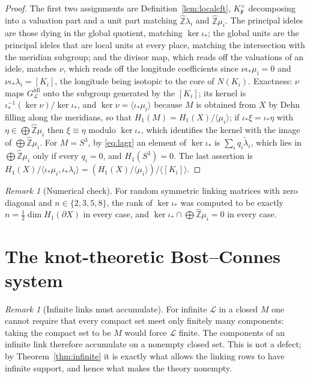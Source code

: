 \documentclass[11pt]{amsart}
\numberwithin{equation}{section}
\theoremstyle{definition}
\theoremstyle{remark}
\newtheorem{remark}[theorem]{Remark}
\newcommand{\Z}{\mathbb{Z}}
\newcommand{\hZ}{\widehat{\Z}}
\newcommand{\cL}{\mathcal{L}}
\newcommand{\pp}{\mathfrak{p}}
\newcommand{\tlam}{\widetilde\lambda}
\begin{document}
\begin{proof}
The first two assignments are Definition~\ref{lem:localcft}, $K_\pp^\times$ decomposing into
a valuation part and a unit part matching $\hZ\lambda_i$ and $\hZ\mu_i$. The principal ideles
are those dying in the global quotient, matching $\ker\iota_*$; the global units are the
principal ideles that are local units at every place, matching the intersection with the
meridian subgroup; and the divisor map, which reads off the valuations of an idele, matches
$\nu$, which reads off the longitude coefficients since $\nu\iota_*\mu_i=0$ and
$\nu\iota_*\lambda_i=[K_i]$, the longitude being isotopic to the core of $N(K_i)$. Exactness:
$\nu$ maps $G_\cL^{\mathrm{idl}}$ onto the subgroup generated by the $[K_i]$; its kernel is
$\iota_*^{-1}(\ker\nu)/\ker\iota_*$, and $\ker\nu=\langle\iota_*\mu_i\rangle$ because $M$ is
obtained from $X$ by Dehn filling along the meridians, so that $H_1(M)=H_1(X)/\langle\mu_i\rangle$;
if $\iota_*\xi=\iota_*\eta$ with $\eta\in\bigoplus\hZ\mu_i$ then $\xi\equiv\eta$ modulo
$\ker\iota_*$, which identifies the kernel with the image of $\bigoplus\hZ\mu_i$. For
$M=S^3$, by \eqref{eq:lagr} an element of $\ker\iota_*$ is $\sum_iq_i\tlam_i$, which lies in
$\bigoplus\hZ\mu_i$ only if every $q_i=0$, and $H_1(S^3)=0$. The last assertion is
$H_1(X)/\langle\iota_*\mu_i,\iota_*\lambda_i\rangle=(H_1(X)/\langle\mu_i\rangle)/\langle[K_i]\rangle$.
\end{proof}

\begin{remark}[Numerical check]\label{rem:numlagr}
For random symmetric linking matrices with zero diagonal and $n\in\{2,3,5,8\}$, the rank of
$\ker\iota_*$ was computed to be exactly $n=\frac12\dim H_1(\partial X)$ in every case, and
$\ker\iota_*\cap\bigoplus\hZ\mu_i=0$ in every case.
\end{remark}

\section{The knot-theoretic Bost--Connes system}\label{sec:system}

\begin{remark}[Infinite links must accumulate]\label{rem:accumulate}
For infinite $\cL$ in a closed $M$ one cannot require that every compact set meet only
finitely many components: taking the compact set to be $M$ would force $\cL$ finite. The
components of an infinite link therefore accumulate on a nonempty closed set. This is not a
defect; by Theorem~\ref{thm:infinite} it is exactly what allows the linking rows to have
infinite support, and hence what makes the theory nonempty.
\end{remark}
\end{document}
